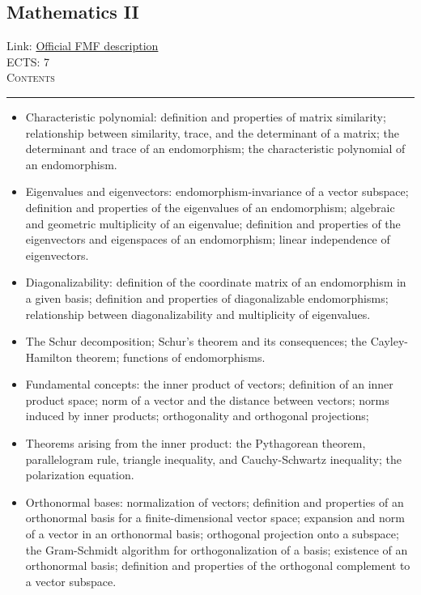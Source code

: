 \documentclass[11pt, a4paper]{article}
\newenvironment{course}[3]{
\subsection{#1}%
Link: \href{#2}{Official FMF description}\\%
ECTS: #3%
\vspace{1ex}
\\
{\large \textsc{Contents}}\\[-0.9ex]%
\rule{\textwidth}{0.5pt}
\vspace{-3ex}
}
{}
\newenvironment{chapter}[1]{
\begin{tcolorbox}[title=#1, breakable]
}
{\end{tcolorbox}}
\begin{document}
\begin{course}{Mathematics II}{https://www.fmf.uni-lj.si/en/study-physics/programmes/1fiz/2020/7000777/courses/521/}{7}
    \begin{chapter}{Endomorphisms of vector spaces}
        \begin{itemize}
            \item Characteristic polynomial: definition and properties of matrix similarity; relationship between similarity, trace, and the determinant of a matrix; the determinant and trace of an endomorphism; the characteristic polynomial of an endomorphism.

            \item Eigenvalues and eigenvectors: endomorphism-invariance of a vector subspace; definition and properties of the eigenvalues of an endomorphism; algebraic and geometric multiplicity of an eigenvalue; definition and properties of the eigenvectors and eigenspaces of an endomorphism; linear independence of eigenvectors.

            \item Diagonalizability: definition of the coordinate matrix of an endomorphism in a given basis; definition and properties of diagonalizable endomorphisms; relationship between diagonalizability and multiplicity of eigenvalues.

            \item The Schur decomposition; Schur's theorem and its consequences; the Cayley-Hamilton theorem; functions of endomorphisms.
        
        \end{itemize}
    \end{chapter}

    \begin{chapter}{Inner product spaces}
        \begin{itemize}
        
            \item Fundamental concepts: the inner product of vectors; definition of an inner product space; norm of a vector and the distance between vectors; norms induced by inner products; orthogonality and orthogonal projections;

            \item Theorems arising from the inner product: the Pythagorean theorem, parallelogram rule, triangle inequality, and Cauchy-Schwartz inequality; the polarization equation.

            \item Orthonormal bases: normalization of vectors; definition and properties of an orthonormal basis for a finite-dimensional vector space; expansion and norm of a vector in an orthonormal basis; orthogonal projection onto a subspace; the Gram-Schmidt algorithm for orthogonalization of a basis; existence of an orthonormal basis; definition and properties of the orthogonal complement to a vector subspace.


\end{itemize}
\end{chapter}
\end{course}
\end{document}
